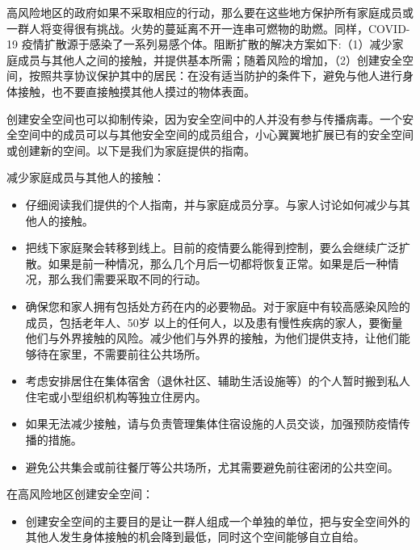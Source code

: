 \documentclass[onecolumn,journal]{IEEEtran}
\begin{document}
\begin{multicols}{2}


高风险地区的政府如果不采取相应的行动，那么要在这些地方保护所有家庭成员或一群人将变得很有挑战。火势的蔓延离不开一连串可燃物的助燃。同样，COVID-19 疫情扩散源于感染了一系列易感个体。阻断扩散的解决方案如下:（1）减少家庭成员与其他人之间的接触，并提供基本所需；随着风险的增加，（2）创建安全空间，按照共享协议保护其中的居民：在没有适当防护的条件下，避免与他人进行身体接触，也不要直接触摸其他人摸过的物体表面。


创建安全空间也可以抑制传染，因为安全空间中的人并没有参与传播病毒。一个安全空间中的成员可以与其他安全空间的成员组合，小心翼翼地扩展已有的安全空间或创建新的空间。以下是我们为家庭提供的指南。

减少家庭成员与其他人的接触：

\begin{itemize}

\item 仔细阅读我们提供的个人指南，并与家庭成员分享。与家人讨论如何减少与其他人的接触。

\item 把线下家庭聚会转移到线上。目前的疫情要么能得到控制，要么会继续广泛扩散。如果是前一种情况，那么几个月后一切都将恢复正常。如果是后一种情况，那么我们需要采取不同的行动。

\item 确保您和家人拥有包括处方药在内的必要物品。对于家庭中有较高感染风险的成员，包括老年人、50岁 以上的任何人，以及患有慢性疾病的家人，要衡量他们与外界接触的风险。减少他们与外界的接触，为他们提供支持，让他们能够待在家里，不需要前往公共场所。

\item 考虑安排居住在集体宿舍（退休社区、辅助生活设施等）的个人暂时搬到私人住宅或小型组织机构等独立住房内。

\item 如果无法减少接触，请与负责管理集体住宿设施的人员交谈，加强预防疫情传播的措施。
\item 避免公共集会或前往餐厅等公共场所，尤其需要避免前往密闭的公共空间。

\end{itemize}

在高风险地区创建安全空间：

\begin{itemize}

\item 创建安全空间的主要目的是让一群人组成一个单独的单位，把与安全空间外的其他人发生身体接触的机会降到最低，同时这个空间能够自立自给。


\end{itemize}
\end{multicols}
\end{document}
